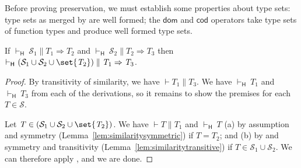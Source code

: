 \documentclass[9pt]{extarticle}
\newcommand{\ottnt}[1]{\mathit{#1}}
\newcommand{\ottsym}[1]{#1}
\begin{document}
{Before proving preservation, we must establish some properties about
type sets: type sets as merged by  are well
formed; the $ \mathsf{dom} $ and $ \mathsf{cod} $ operators take type sets of
function types and produce well formed type sets.

\begin{lemma}
  \label{lem:heedfulmergewf}
  If $ \mathord{  \vdash _{  \mathsf{H}  } }~ \mathcal{S}_{{\mathrm{1}}}   \mathrel{\parallel}   \ottnt{T_{{\mathrm{1}}}}  \Rightarrow  \ottnt{T_{{\mathrm{2}}}} $ and $ \mathord{  \vdash _{  \mathsf{H}  } }~ \mathcal{S}_{{\mathrm{2}}}   \mathrel{\parallel}   \ottnt{T_{{\mathrm{2}}}}  \Rightarrow  \ottnt{T_{{\mathrm{3}}}} $ then $ \mathord{  \vdash _{  \mathsf{H}  } }~ \ottsym{(}    \mathcal{S}_{{\mathrm{1}}}  \cup  \mathcal{S}_{{\mathrm{2}}}   \cup   \set{  \ottnt{T_{{\mathrm{2}}}}  }    \ottsym{)}   \mathrel{\parallel}   \ottnt{T_{{\mathrm{1}}}}  \Rightarrow  \ottnt{T_{{\mathrm{3}}}} $.
\begin{proof}
    By transitivity of similarity, we have $\vdash  \ottnt{T_{{\mathrm{1}}}}  \mathrel{\parallel}  \ottnt{T_{{\mathrm{3}}}}$. We have
    $ \mathord{  \vdash _{  \mathsf{H}  } }~ \ottnt{T_{{\mathrm{1}}}} $ and $ \mathord{  \vdash _{  \mathsf{H}  } }~ \ottnt{T_{{\mathrm{3}}}} $ from each of the 
    derivations, so it remains to show the premises for each $ \ottnt{T}  \in  \mathcal{S} $.

    Let $ \ottnt{T}  \in  \ottsym{(}    \mathcal{S}_{{\mathrm{1}}}  \cup  \mathcal{S}_{{\mathrm{2}}}   \cup   \set{  \ottnt{T_{{\mathrm{2}}}}  }    \ottsym{)} $. We have $\vdash  \ottnt{T}  \mathrel{\parallel}  \ottnt{T_{{\mathrm{1}}}}$ and
    $ \mathord{  \vdash _{  \mathsf{H}  } }~ \ottnt{T} $ (a) by assumption and symmetry
    (Lemma~\ref{lem:similaritysymmetric}) if $\ottnt{T}  \ottsym{=}  \ottnt{T_{{\mathrm{2}}}}$; and (b) by
     and symmetry and transitivity
    (Lemma~\ref{lem:similaritytransitive}) if $ \ottnt{T}  \in   \mathcal{S}_{{\mathrm{1}}}  \cup  \mathcal{S}_{{\mathrm{2}}}  $. We
    can therefore apply , and we are done.
  \end{proof}
\end{lemma}

}
\end{document}
